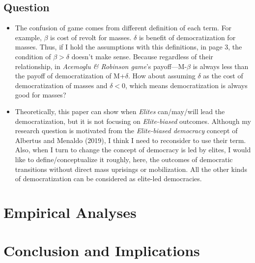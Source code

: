 \documentclass[11pt]{article}
\begin{document}
\subsection*{Question}
\begin{itemize}
	\item The confusion of game comes from different definition of each term. For example, $\beta$ is cost of revolt for masses. $\delta$ is benefit of democratization for masses. Thus, if I hold the assumptions with this definitions, in page 3, the condition of $\beta > \delta$ doesn't make sense. Because regardless of their relationship, in \textit{Acemoglu \& Robinson game}'s payoff---M-$\beta$ is always less than the payoff of democratization of M+$\delta$. How about assuming $\delta$ as the cost of democratization of masses and $\delta <0$, which means democratization is always good for masses?
	\item Theoretically, this paper can show when \textit{Elites} can/may/will lead the democratization, but it is not focusing on \textit{Elite-biased} outcomes. Although my research question is motivated from the \textit{Elite-biased democracy} concept of Albertus and Menaldo (2019), I think I need to reconsider to use their term. Also, when I turn to change the concept of democracy is led by elites, I would like to define/conceptualize it roughly, here, the outcomes of democratic transitions without direct mass uprisings or mobilization. All the other kinds of democratization can be considered as elite-led democracies.
\end{itemize}

\section*{Empirical Analyses}

\section*{Conclusion and Implications}



	
\end{document}
